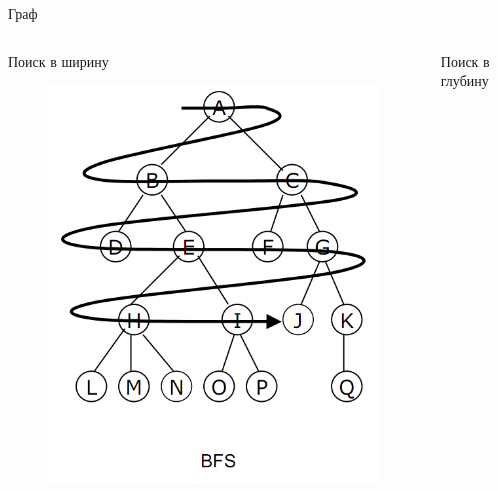 \documentclass[10pt]{beamer}
\begin{document}
\begin{frame}{Граф}
\begin{columns}
	\begin{column}{.4\linewidth}
		Поиск в ширину
		\begin{figure}
		\centerline{\includegraphics[width=1.0\linewidth]{images/bfs.png}}
		\end{figure}
	\end{column}
	\begin{column}{.4\linewidth}
		Поиск в глубину
		\begin{figure}

\end{figure}
\end{column}
\end{columns}
\end{frame}
\end{document}
